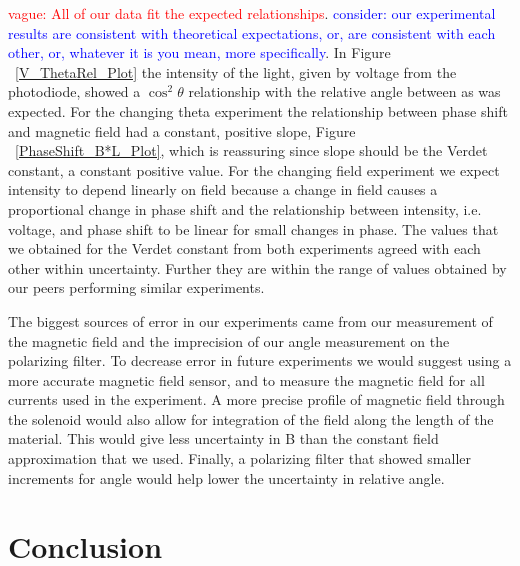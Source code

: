 \documentclass[prb,preprint]{revtex4-1}
\begin{document}
\textcolor{red}{vague: All of our data fit the expected relationships}. \textcolor{blue}{consider: our experimental results are consistent with theoretical expectations, or, are consistent with each other, or, whatever it is you mean, more specifically}.  In Figure ~\ref{V_ThetaRel_Plot} the intensity of the light, given by voltage from the photodiode, showed a $\cos^2\theta$ relationship with the relative angle between as was expected. For the changing theta experiment the relationship between phase shift and magnetic field had a constant, positive slope, Figure ~\ref{PhaseShift_B*L_Plot}, which is reassuring since slope should be the Verdet constant, a constant positive value.  For the changing field experiment we expect intensity to depend linearly on field because a change in field causes a proportional change in phase shift and the relationship between intensity, i.e. voltage, and phase shift to be linear for small changes in phase. The values that we obtained for the Verdet constant from both experiments agreed with each other within uncertainty. Further they are within the range of values obtained by our peers performing similar experiments.

The biggest sources of error in our experiments came from our measurement of the magnetic field and the imprecision of our angle measurement on the polarizing filter. To decrease error in future experiments we would suggest using a more accurate magnetic field sensor, and to measure the magnetic field for all currents used in the experiment. A more precise profile of magnetic field through the solenoid would also allow for integration of the field along the length of the material. This would give less uncertainty in B than the constant field approximation that we used. Finally, a polarizing filter that showed smaller increments for angle would help lower the uncertainty in relative angle. 

\section{Conclusion}
\end{document}
